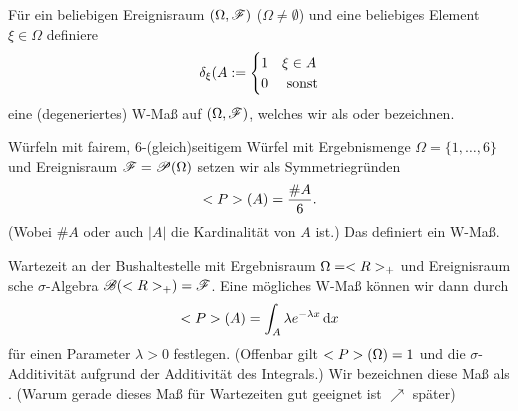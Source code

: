 \begin{example}
	Für ein beliebigen Ereignisraum $(\Omega, \mathscr{F})$ ($\Omega \neq \emptyset$) und eine beliebiges Element $\xi \in \Omega$ definiere
	\begin{align}
		\delta_{\xi}(A := \begin{cases}
		1 & \xi \in A \\
		0 & \text{ sonst}
		\end{cases}\notag
	\end{align}
	eine (degeneriertes) W-Maß auf $(\Omega, \mathscr{F})$, welches wir als  oder  bezeichnen.
\end{example}

\begin{example}
	Würfeln mit fairem, $6$-(gleich)seitigem Würfel mit Ergebnismenge $\Omega=\{1, \dots, 6\}$ und Ereignisraum $\mathscr{F} = \mathscr{P}(\Omega)$ setzen wir als Symmetriegründen
	\begin{align}
		<P>(A) = \frac{\# A}{6}.\notag
	\end{align}
	(Wobei $\# A$ oder auch $\vert A \vert$ die Kardinalität von $A$ ist.) Das definiert ein W-Maß.
\end{example}

\begin{example}
	Wartezeit an der Bushaltestelle mit Ergebnisraum $\Omega = <R>_{+}$ und Ereignisraum sche $\sigma$-Algebra $\mathscr{B}(<R>_{+}) = \mathscr{F}$. Eine mögliches W-Maß können wir dann durch
	\begin{align}
	\probp(A) = \int_{A} \lambda e^{-\lambda x} \diff x\notag %
	\end{align}
	für einen Parameter $\lambda > 0$ festlegen. (Offenbar gilt $<P>(\Omega) = 1$ und die $\sigma$-Additivität aufgrund der Additivität des Integrals.) Wir bezeichnen diese Maß als . (Warum gerade dieses Maß für Wartezeiten gut geeignet ist $\nearrow$ später) %
\end{example}



